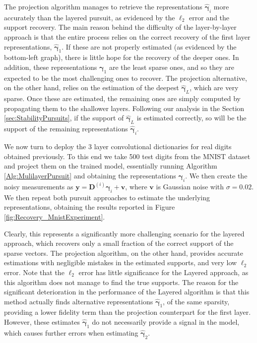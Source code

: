 \documentclass[10pt,journal]{IEEEtran}
\def\v{{\mathbf v}}
\def\y{{\mathbf y}}
\def\D{{\mathbf D}}
\def\gama{{\boldsymbol \gamma}}
\theoremstyle{plain}
\theoremstyle{definition}
\begin{document}
The projection algorithm manages to retrieve the representations $\hat{\gama}_i$ more accurately than the layered pursuit, as evidenced by the $\ell_2$ error and the support recovery. The main reason behind the difficulty of the layer-by-layer approach is that the entire process relies on the correct recovery of the first layer representations, $\hat{\gama}_1$. If these are not properly estimated (as evidenced by the bottom-left graph), there is little hope for the recovery of the deeper ones. In addition, these representations $\gama_1$ are the least sparse ones, and so they are expected to be the most challenging ones to recover. The projection alternative, on the other hand, relies on the estimation of the deepest $\hat{\gama}_L$, which are very sparse. Once these are estimated, the remaining ones are simply computed by propagating them to the shallower layers. Following our analysis in the Section \ref{sec:StabilityPursuits}, if the support of $\hat{\gama}_L$ is estimated correctly, so will be the support of the remaining representations $\hat{\gama}_i$.

We now turn to deploy the 3 layer convolutional dictionaries for real digits obtained previously. To this end we take 500 test digits from the MNIST dataset and project them on the trained model, essentially running Algorithm \ref{Alg:MulilayerPursuit} and obtaining the representations $\gama_i$. We then create the noisy measurements as $\y = \D^{(i)}\gama_i + \v$, where $\v$ is Gaussian noise with $\sigma = 0.02$. We then repeat both pursuit approaches to estimate the underlying representations, obtaining the results reported in Figure \ref{fig:Recovery_MnistExperiment}. 

Clearly, this represents a significantly more challenging scenario for the layered approach, which recovers only a small fraction of the correct support of the sparse vectors. The projection algorithm, on the other hand, provides accurate estimations with negligible mistakes in the estimated supports, and very low $\ell_2$ error. Note that the $\ell_2$ error has little significance for the Layered approach, as this algorithm does not manage to find the true supports.
The reason for the significant deterioration in the performance of the Layered algorithm is that this method actually finds alternative representations $\hat{\gama}_1$, of the same sparsity, providing a lower fidelity term than the projection counterpart for the first layer. However, these estimates $\hat{\gama}_1$ do not necessarily provide a signal in the model, which causes further errors when estimating $\hat{\gama}_2$. 
\end{document}
